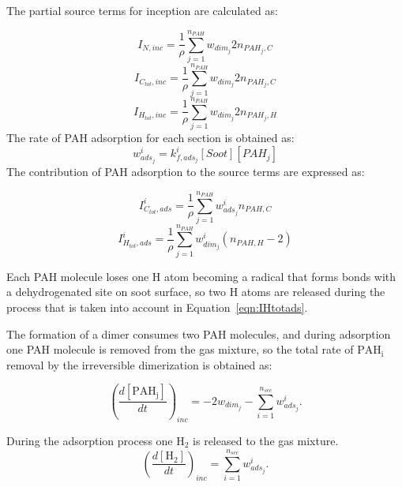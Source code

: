 The partial source terms for inception are calculated as:

\begin{equation}
	I_{N,inc} =\frac{1}{\rho} \sum_{j=1}^{n_{PAH}} w_{dim_j} 2n_{PAH_j,C}
	\label{eqn:INinc}
\end{equation}
\begin{equation}
	I_{C_{tot},inc} = \frac{1}{\rho}\sum_{j=1}^{n_{PAH}} w_{dim_j} 2n_{PAH_j,C}
	\label{eqn:ICtotinc}
\end{equation}
\begin{equation}
	I_{H_{tot},inc} =\frac{1}{\rho} \sum_{j=1}^{n_{PAH}} w_{dim_j} 2n_{PAH_j,H}
	\label{eqn:IHtotinc}
\end{equation}
The rate of PAH adsorption for each section is obtained as:
\begin{equation}
	w^i_{ads_j} = k^i_{f,ads_{j}} [Soot] [PAH_j]
	\label{eqn:adsrate_irrevdim}
\end{equation}
The contribution of PAH adsorption to the source terms are expressed as:

\begin{equation}
	I^i_{C_{tot},ads} = \frac{1}{\rho}\sum_{j=1}^{n_{PAH}} w^i_{ads_j} n_{PAH,C}
	\label{eqn:ICtotads}
\end{equation}
\begin{equation}
	I^i_{H_{tot},ads} =\frac{1}{\rho} \sum_{j=1}^{n_{PAH}} w^i_{dim_j} (n_{PAH,H}-2)
	\label{eqn:IHtotads}
\end{equation}


Each PAH molecule loses one H atom becoming a radical that forms bonds with a dehydrogenated site on soot surface, so two H atoms are released during the process that is taken into account in Equation~\eqref{eqn:IHtotads}.

The formation of a dimer consumes two PAH molecules, and during adsorption one PAH molecule is removed from the gas mixture, so the total rate of $\mathrm{PAH_i}$ removal by the irreversible dimerization is obtained as:

\begin{equation}
	\left(
		\frac{d\left[{\mathrm{PAH_j}}\right]}{dt}
	\right)_{inc}
	= 
	-2w_{dim_j}-\sum_{i=1}^{n_{sec}}w^i_{ads_j}
	\label{eqn:PAHscrub_irrevdim}.
\end{equation}

During the adsorption process one $\mathrm{H_2}$ is released to the gas mixture.
\begin{equation}
	\left(
		\frac{d\left[{\mathrm{H_2}}\right]}{dt}
	\right)_{inc}
	= 
	\sum_{i=1}^{n_{sec}}w^i_{ads_j}
	\label{eqn:H2scrub_irrevdim}.
\end{equation}


